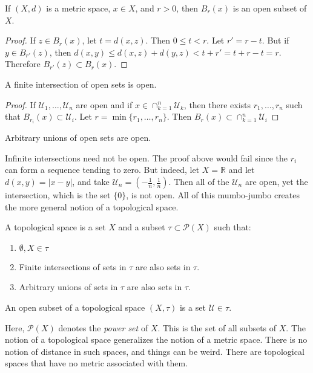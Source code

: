 \documentclass[crop=false,class=article,oneside]{standalone}
\begin{document}
        \begin{theorem}
            If $(X,d)$ is a metric space, $x\in{X}$,
            and $r>0$, then $B_{r}(x)$ is an open
            subset of $X$.
        \end{theorem}
        \begin{proof}
            If $z\in{B_{r}(x)}$, let $t=d(x,z)$.
            Then $0\leq{t}<r$. Let $r'=r-t$.
            But if $y\in{B_{r'}(z)}$, then
            $d(x,y)\leq{d(x,z)+d(y,z)}<t+r'=t+r-t=r$.
            Therefore $B_{r'}(z)\subset{B_{r}(x)}$.
        \end{proof}
        \begin{theorem}
            A finite intersection of open sets is open.
        \end{theorem}
        \begin{proof}
            If $\mathcal{U}_{1},\hdots,\mathcal{U}_{n}$
            are open and if
            $x\in\cap_{k=1}^{n}\mathcal{U}_{k}$, then there
            exists $r_{1},\hdots,r_{n}$ such that
            $B_{r_{i}}(x)\subset\mathcal{U}_{i}$. Let
            $r=\min\{r_{1},\hdots,r_{n}\}$. Then
            $B_{r}(x)\subset\cap_{k=1}^{n}\mathcal{U}_{i}$
        \end{proof}
        \begin{theorem}
            Arbitrary unions of open sets are open.
        \end{theorem}
        Infinite intersections need not be open.
        The proof above would fail since the
        $r_{i}$ can form a sequence tending to zero.
        But indeed, let $X=\mathbb{R}$ and let
        $d(x,y)=|x-y|$, and take
        $\mathcal{U}_{n}=(-\frac{1}{n},\frac{1}{n})$.
        Then all of the $\mathcal{U}_{n}$ are open,
        yet the intersection, which is the set $\{0\}$,
        is not open. All of this mumbo-jumbo creates
        the more general notion of a topological space.
        \begin{definition}
            A topological space is a set $X$ and a
            subset $\tau\subset\mathcal{P}(X)$ such that:
            \begin{enumerate}
                \item $\emptyset,X\in\tau$
                \item Finite intersections of sets in $\tau$
                      are also sets in $\tau$.
                \item Arbitrary unions of sets in $\tau$
                      are also sets in $\tau$.
            \end{enumerate}
        \end{definition}
        \begin{definition}
            An open subset of a topological space
            $(X,\tau)$ is a set $\mathcal{U}\in\tau$.
        \end{definition}
        Here, $\mathcal{P}(X)$ denotes the \textit{power set}
        of $X$. This is the set of all subsets of $X$.
        The notion of a topological space generalizes the
        notion of a metric space. There is no notion of
        distance in such spaces, and things can be weird.
        There are topological spaces that have no metric
        associated with them.
\end{document}

